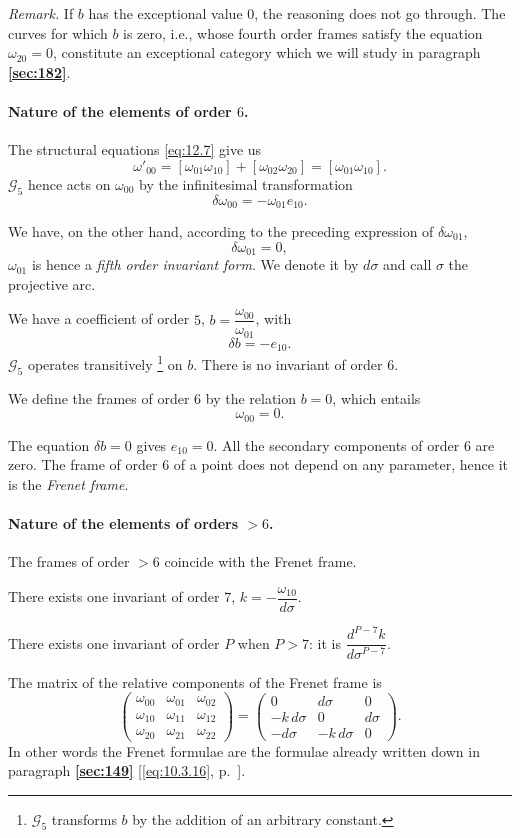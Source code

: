 \documentclass[leqno,11pt]{book}
\numberwithin{equation}{chapter}
\theoremstyle{shape1}
\theoremstyle{shapesmall}
\newcommand{\fsref}[1]{{\rm\textsection\textbf{\ref{sec:#1}}}}
\newcommand{\somespace}{\vspace{9pt}}
\begin{document}
\somespace

\emph{Remark.} If $b$ has the exceptional value $0$, the reasoning does not go through. The curves for which $b$ is zero, i.e., whose fourth order frames satisfy the equation $\omega_{20}=0$, constitute an exceptional category which we will study in paragraph \fsref{182}.

\paragraph{Nature of the elements of order $6$.}
\label{sec:180}
The structural equations \eqref{eq:12.7} give us
\[
\omega'_{00}=[\omega_{01}\omega_{10}]+[\omega_{02}\omega_{20}]=[\omega_{01}\omega_{10}].
\]
$\mathcal{G}_{5}$ hence acts on $\omega_{00}$ by the infinitesimal transformation
\[
\delta\omega_{00}=-\omega_{01}e_{10}.
\]

We have, on the other hand, according to the preceding expression of $\delta\omega_{01}$,
\[
\delta\omega_{01}=0,
\]
$\omega_{01}$ is hence a \emph{fifth order invariant form}. We denote it by $d\sigma$ and call $\sigma$ the projective arc.

We have a coefficient of order $5$, $b=\dfrac{\omega_{00}}{\omega_{01}}$, with
\[
\delta b=-e_{10}.
\]
$\mathcal{G}_{5}$ operates transitively \footnote{$\mathcal{G}_{5}$ transforms $b$ by the addition of an arbitrary constant.} on $b$. There is no invariant of order $6$.

We define the frames of order $6$ by the relation $b=0$, which entails
\[
\omega_{00}=0.
\]

The equation $\delta b=0$ gives $e_{10}=0$. All the secondary components of order $6$ are zero. The frame of order $6$ of a point does not depend on any parameter, hence it is the \emph{Frenet frame}.

\paragraph{Nature of the elements of orders $>6$.}
\label{sec:181}
The frames of order $>6$ coincide with the Frenet frame.

There exists one invariant of order $7$, $k=-\dfrac{\omega_{10}}{d\sigma}$.

There exists one invariant of order $P$ when $P>7$: it is $\dfrac{d^{P-7}k}{d\sigma^{P-7}}$.

The matrix of the relative components of the Frenet frame is
\[
\begin{pmatrix}
  \omega_{00}&\omega_{01}&\omega_{02}\\
  \omega_{10}&\omega_{11}&\omega_{12}\\
  \omega_{20}&\omega_{21}&\omega_{22}
\end{pmatrix}
=
\begin{pmatrix}
  0&d\sigma&0\\
  -k\,d\sigma&0&d\sigma\\
  -d\sigma&-k\,d\sigma&0
\end{pmatrix}.
\]
In other words the Frenet formulae are the formulae already written down in paragraph \fsref{149} [\eqref{eq:10.3.16}, p.~\pageref{eq:10.3.16}].
\end{document}
